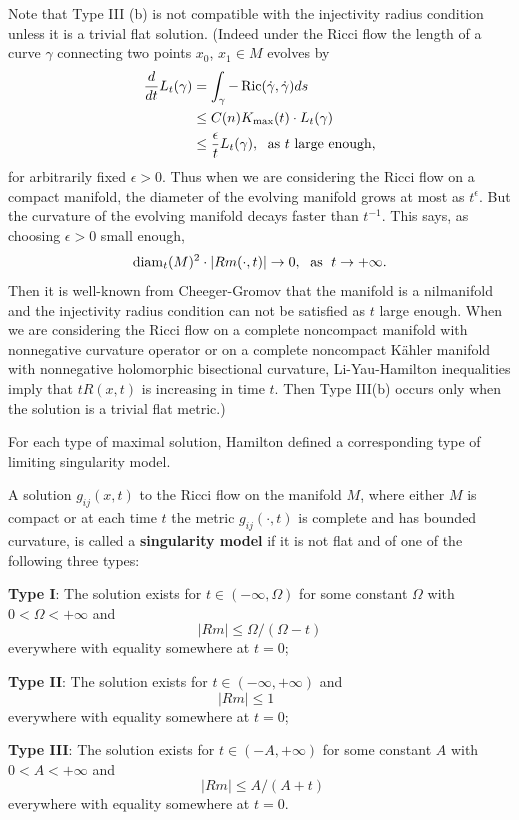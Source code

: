 Note that Type III (b) is not compatible with the injectivity
radius condition unless it is a trivial flat solution. (Indeed
under the Ricci flow the length of a curve $\gamma$ connecting two
points $x_0$, $x_1\in M$ evolves by
\begin{align*}
\frac{d}{dt}L_t(\gamma)
&  = \int_{\gamma}-\operatorname{Ric}(\dot{\gamma},\dot{\gamma})ds\\
&  \leq C(n)K_{\max}(t)\cdot L_t(\gamma)\\
&  \leq \frac{\epsilon}{t}L_t(\gamma),\; \text{ as $t$ large
enough,}
\end{align*}
for arbitrarily fixed $\epsilon>0$. Thus when we are considering
the Ricci flow on a compact manifold, the diameter of the evolving
manifold grows at most as $t^{\epsilon}$. But the curvature of the
evolving manifold decays faster than $t^{-1}$. This says, as
choosing $\epsilon>0$ small enough,
$$
{\rm diam}_t(M)^2\cdot |Rm(\cdot,t)|\rightarrow0,\; \text{ as }\;
t\rightarrow+\infty.
$$
Then it is well-known from Cheeger-Gromov \cite{Gro78} that the
manifold is a nilmanifold and the injectivity radius condition can
not be satisfied as $t$ large enough. When we are considering the
Ricci flow on a complete noncompact manifold with nonnegative
curvature operator or on a complete noncompact K\"ahler manifold
with nonnegative holomorphic bisectional curvature,
Li-Yau-Hamilton inequalities imply that $tR(x,t)$ is increasing in
time $t$. Then Type III(b) occurs only when the solution is a
trivial flat metric.)

For each type of maximal solution, Hamilton \cite{Ha95F} defined a
corresponding type of limiting singularity model.

\begin{definition}
  \label{def:cz-singularity-types-for-maximal-ricci-flows}
A solution $g_{ij}(x,t)$ to the Ricci flow on the manifold $M$,
where either $M$ is compact or at each time $t$ the metric
$g_{ij}(\cdot,t)$ is complete and has bounded curvature, is called
a {\bf singularity model} if it is not
flat and of one of the following three types:

\vskip 0.1cm\noindent \textbf{Type I}: The solution
exists for $t\in(-\infty,\Omega)$ for some constant $\Omega$ with
$0<\Omega<+\infty$ and
$$
|Rm|\leq\Omega/(\Omega-t)
$$
everywhere with equality somewhere at $t=0$;

\vskip 0.1cm\noindent \textbf{Type II}: The
solution exists for $t\in(-\infty,+\infty)$  and
$$
|Rm|\leq 1 \ \ \ \ \ \ \ \ \
$$
everywhere with equality somewhere at $t=0$;

\vskip 0.1cm\noindent \textbf{Type III}: The
solution exists for $t\in(-A,+\infty)$ for some constant $A$ with
$0<A<+\infty$ and
$$
\ \ |Rm|\leq A/(A+t)
$$
everywhere with equality somewhere at $t=0$.
\end{definition}

